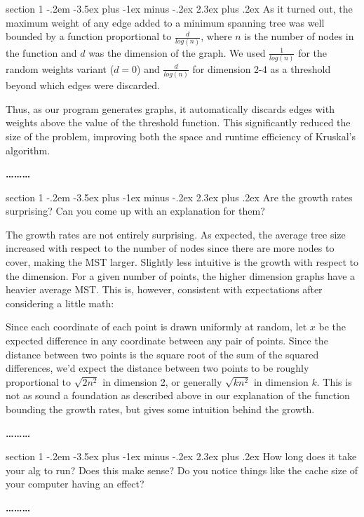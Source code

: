 \documentclass[12pt]{article}
\makeatletter
\newenvironment{problem}{\@startsection
       {section}
       {1}
       {-.2em}
       {-3.5ex plus -1ex minus -.2ex}
       {2.3ex plus .2ex}
       {\pagebreak[3]%
       \large\bf\noindent{Problem }
       }
       }
       {%
       \begin{center}\large\bf \ldots\ldots\ldots\end{center}}
\makeatother
\begin{document}
\begin{problem}{}
As it turned out, the maximum weight of any edge added to a minimum spanning tree was well bounded by a function proportional to $\frac{d}{log(n)}$, where $n$ is the number of nodes in the function and $d$ was the dimension of the graph. We used $\frac{1}{log(n)}$ for the random weights variant ($d=0$) and $\frac{d}{log(n)}$ for dimension 2-4 as a threshold beyond which edges were discarded.

Thus, as our program generates graphs, it automatically discards edges with weights above the value of the threshold function.  This significantly reduced the size of the problem, improving both the space and runtime efficiency of Kruskal's algorithm.

\end{problem}

\begin{problem}{}
Are the growth rates surprising? Can you come up with an explanation
for them?

The growth rates are not entirely surprising.  As expected, the average tree size increased with respect to the number of nodes since there are more nodes to cover, making the MST larger.  Slightly less intuitive is the growth with respect to the dimension.  For a given number of points, the higher dimension graphs have a heavier average MST.  This is, however, consistent with expectations after considering a little math:

Since each coordinate of each point is drawn uniformly at random, let $x$ be the expected difference in any coordinate between any pair of points.  Since the distance between two points is the square root of the sum of the squared differences, we'd expect the distance between two points to be roughly proportional to $\sqrt{2n^2}$ in dimension 2, or generally $\sqrt{kn^2}$ in dimension $k$.  This is not as sound a foundation as described above in our explanation of the function bounding the growth rates, but gives some intuition behind the growth.

\end{problem}

\begin{problem}{}
How long does it take your alg to run? Does this make sense? Do you
notice things like the cache size of your computer having an effect?

\end{problem}
\end{document}
